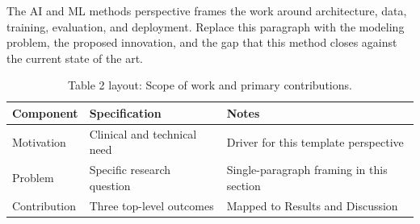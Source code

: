 
The AI and ML methods perspective frames the work around architecture, data, training, evaluation, and deployment. Replace this paragraph with the modeling problem, the proposed innovation, and the gap that this method closes against the current state of the art.

\begin{table}[H]
\caption{Table 2 layout: Scope of work and primary contributions.}
\label{tab:intro_overview}
\centering
\begin{tabular}{>{\raggedright\arraybackslash}p{3.4cm} >{\raggedright\arraybackslash}p{4.6cm} >{\raggedright\arraybackslash}p{5.4cm}}
\toprule
\textbf{Component} & \textbf{Specification} & \textbf{Notes} \\
\midrule
  Motivation & Clinical and technical need & Driver for this template perspective \\
  Problem & Specific research question & Single-paragraph framing in this section \\
  Contribution & Three top-level outcomes & Mapped to Results and Discussion \\
\bottomrule
\end{tabular}
\end{table}
